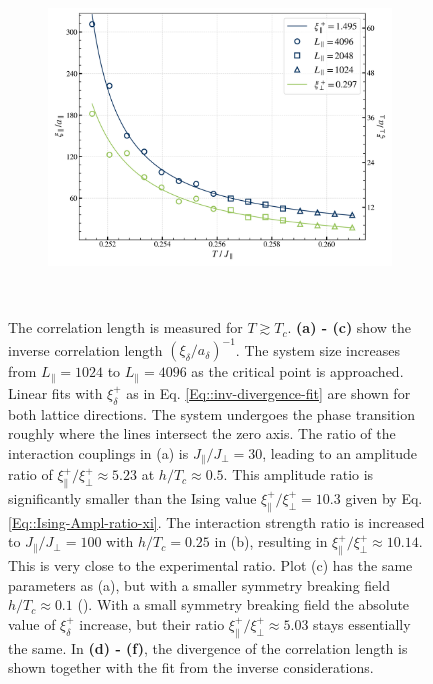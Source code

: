 \begin{figure}[htp]
\begin{subfigure}{0.475\textwidth}
		\end{subfigure}
		\begin{subfigure}{0.475\textwidth}
			\centering
			\includegraphics[width=0.95\linewidth]{graphics/xi-divergence-small-h-4.png}
		\end{subfigure} \\ \par\bigskip
		\caption{The correlation length is measured for $T \gtrsim T_c$. \textbf{(a) - (c)}  show the inverse correlation length $(\xi_\delta /	a_\delta)^{-1}$. The system size increases from $L_\parallel =	1024$ to $L_\parallel =	4096$ as the critical point is approached. Linear fits with $\xi_\delta^+$ as in Eq. \eqref{Eq::inv-divergence-fit} are shown for both lattice directions. The system undergoes the phase transition roughly where the lines intersect the zero axis. The ratio of the interaction couplings in (a) is $ J_\parallel /	J_\perp =	30$, leading to an amplitude ratio of $\xi_{\parallel}^+ /	\xi_\perp^+  \approx  5.23$ at $h /	T_c \approx 0.5$. This amplitude ratio is significantly smaller than the Ising value $\xi_{\parallel}^+ /	\xi_\perp^+ =	10.3$ given by Eq. \eqref{Eq::Ising-Ampl-ratio-xi}. The interaction strength ratio is increased to $ J_\parallel /	J_\perp =	100$ with $h /	T_c =	0.25$ in (b), resulting in  $\xi_{\parallel}^+ /	\xi_\perp^+  \approx  10.14$. This is very close to the experimental ratio. Plot (c) has the same parameters as (a), but with a smaller symmetry breaking field $h / T_c  \approx 0.1$ (). With a small symmetry breaking field the absolute value of $\xi_\delta^+$ increase, but their ratio  $\xi_{\parallel}^+ /	\xi_\perp^+  \approx  5.03$ stays essentially the same. In \textbf{(d) - (f)}, the divergence of the correlation length is shown together with the fit from the inverse considerations.}
		\label{Fig::Amplitude-Result}
	\end{figure}	
